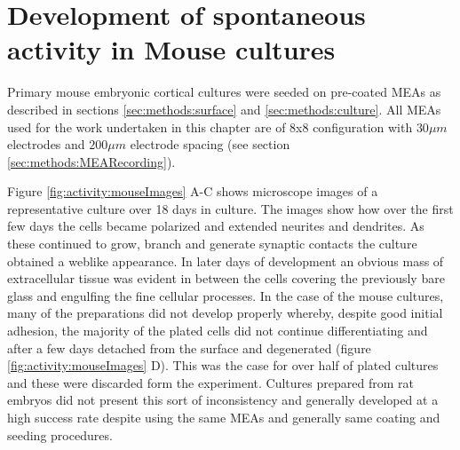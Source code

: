     \section{Development of spontaneous activity in Mouse cultures}
    \label{sec:activity:spontActivity}
    Primary mouse embryonic cortical cultures were seeded on pre-coated MEAs as described in sections \ref{sec:methods:surface} and \ref{sec:methods:culture}. All MEAs used for the work undertaken in this chapter are of 8x8 configuration with \(30 \mu m\) electrodes and \(200 \mu m\) electrode spacing (see section \ref{sec:methods:MEARecording}).

    Figure \ref{fig:activity:mouseImages} A-C shows microscope images of a representative culture over 18 days in culture. The images show how over the first few days the cells became polarized and extended neurites and dendrites. As these continued to grow, branch and generate synaptic contacts the culture obtained a weblike appearance. In later days of development an obvious mass of extracellular tissue was evident in between the cells covering the previously bare glass and engulfing the fine cellular processes. In the case of the mouse cultures, many of the preparations did not develop properly whereby, despite good initial adhesion, the majority of the plated cells did not continue differentiating and after a few days detached from the surface and degenerated (figure \ref{fig:activity:mouseImages} D). This was the case for over half of plated cultures and these were discarded form the experiment. Cultures prepared from rat embryos did not present this sort of inconsistency and generally developed at a high success rate despite using the same MEAs and generally same coating and seeding procedures.
